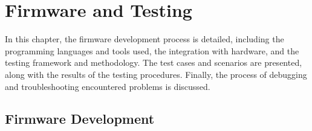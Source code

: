 \chapter{Firmware and Testing}

\graphicspath{{./Figures/Firmware and Testing/}}
In this chapter, the firmware development process is detailed, including the programming languages and tools used, the integration with hardware, and the testing framework and methodology.
The test cases and scenarios are presented, along with the results of the testing procedures.
Finally, the process of debugging and troubleshooting encountered problems is discussed.

\newpage

\section{Firmware Development}
